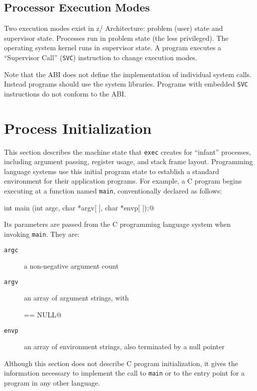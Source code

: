 \documentclass[english,11pt,twoside,toc=bib,toc=idx]{scrreprt}
\newcommand{\ARCH}{z/\kern-1pt Ar\-chi\-tec\-ture}
\newcommand{\ARCHarch}{\ARCH}
\newcommand{\ARCH}{ESA/390}
\newcommand{\ARCHarch}{the \ARCH{} ar\-chi\-tec\-ture}
\begin{document}
\subsection{Processor Execution Modes}
Two execution modes exist in \ARCHarch{}: problem (user) state and
supervisor state.  Processes run in problem state (the less privileged).
The operating system kernel runs in supervisor state.  A program executes
a ``Supervisor Call'' (\texttt{SVC}) instruction to change execution
modes.

Note that the ABI does not define the implementation of individual
system calls.  Instead programs should use the system libraries.
Programs with embedded \texttt{SVC} instructions do not conform
to the ABI.

\section{Process Initialization}
\label{procinit}
This section describes the machine state that \texttt{exec} creates
for ``infant'' processes, including argument passing, register usage,
and stack frame layout.  Programming language systems use this initial
program state to establish a standard environment for their
application programs.  For example, a C program begins executing at a
function named \texttt{main}, conventionally declared as follows:
\begin{center}
  \lstinline@extern int main (int argc, char *argv[ ], char *envp[ ]);@
\end{center}

Its parameters are passed from the C programming language system when
invoking \texttt{main}.  They are:
\begin{description}
\item[\texttt{argc}] a non-negative argument count
\item[\texttt{argv}] an array of argument strings, with
  \begin{center}
    \lstinline@argv[argc] == NULL@
  \end{center}
\item[\texttt{envp}] an array of environment strings, also terminated by a
  null pointer
\end{description}

Although this section does not describe C program initialization, it
gives the information necessary to implement the call to \texttt{main}
or to the entry point for a program in any other language.
\end{document}
